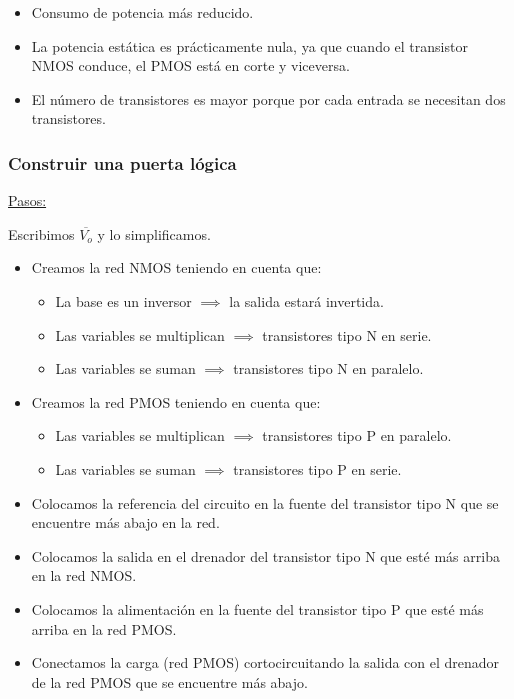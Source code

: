 \documentclass[10pt,a4paper]{article}
\begin{document}
	\begin{itemize}
		\item Consumo de potencia más reducido.
		\item La potencia estática es prácticamente nula, ya que cuando el transistor NMOS conduce, el PMOS está en corte y viceversa.
		\item El número de transistores es mayor porque por cada entrada se necesitan dos transistores.
	\end{itemize}

	\subsubsection{Construir una puerta lógica}
	
	\underline{Pasos:} \newline
	
	Escribimos $\overline{V_o}$ y lo simplificamos.
	
	\begin{itemize}
		\item Creamos la red NMOS teniendo en cuenta que:
		\begin{itemize}
			\item La base es un inversor $\implies$ la salida estará invertida.
			\item Las variables se multiplican $\implies$ transistores tipo N en serie.
			\item Las variables se suman $\implies$ transistores tipo N en paralelo.
		\end{itemize}
		\item Creamos la red PMOS teniendo en cuenta que:
		\begin{itemize}
			\item Las variables se multiplican $\implies$ transistores tipo P en paralelo.
			\item Las variables se suman $\implies$ transistores tipo P en serie.
		\end{itemize}
	\item Colocamos la referencia del circuito en la fuente del transistor tipo N que se encuentre más abajo en la red.
	\item Colocamos la salida en el drenador del transistor tipo N que esté más arriba en la red NMOS.
	\item Colocamos la alimentación en la fuente del transistor tipo P que esté más arriba en la red PMOS.
	\item Conectamos la carga (red PMOS) cortocircuitando la salida con el drenador de la red PMOS que se encuentre más abajo.
	\end{itemize}
\end{document}
